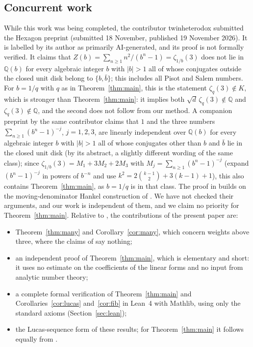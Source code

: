 \documentclass[11pt]{amsart}
\theoremstyle{definition}
\theoremstyle{remark}
\numberwithin{equation}{section}
\newcommand{\QQ}{\mathbb{Q}}
\begin{document}
\subsection*{Concurrent work}
While this work was being completed, the contributor twinheterodox submitted the Hexagon preprint \cite{Twi26}
(submitted 18 November, published 19 November 2026). It is labelled by its author as primarily AI-generated, and its
proof is not formally verified. It claims that $Z(b)=\sum_{n\ge1}n^2/(b^n-1)=\zeta_{1/b}(3)$ does not lie in $\QQ(b)$
for every algebraic integer $b$ with $|b|>1$ all of whose conjugates outside the closed unit disk belong to
$\{b,\bar b\}$; this includes all Pisot and Salem numbers. For $b=1/q$ with $q$ as in Theorem~\ref{thm:main}, this is
the statement $\zeta_q(3)\notin K$, which is stronger than Theorem~\ref{thm:main}: it implies both
$\sqrt d\,\zeta_q(3)\notin\QQ$ and $\zeta_q(3)\notin\QQ$, and the second does not follow from our method. A companion
preprint by the same contributor \cite{Twi26b} claims that $1$ and the three numbers $\sum_{n\ge1}(b^n-1)^{-j}$,
$j=1,2,3$, are linearly independent over $\QQ(b)$ for every algebraic integer $b$ with $|b|>1$ all of whose
conjugates other than $b$ and $\bar b$ lie in the closed unit disk (by its abstract, a slightly different wording of the
same class); since
$\zeta_{1/b}(3)=M_1+3M_2+2M_3$ with $M_j=\sum_{n\ge1}(b^n-1)^{-j}$ (expand $(b^n-1)^{-j}$ in powers of $b^{-n}$ and use
$k^2=2\binom{k-1}2+3(k-1)+1$), this also contains Theorem~\ref{thm:main}, as $b=1/q$ is in that class. The proof in \cite{Twi26} builds on
the moving-denominator Hankel construction of \cite{UPL}. We have not checked their arguments, and our work is independent of
them, and we claim no priority for Theorem~\ref{thm:main}. Relative to \cite{Twi26,Twi26b}, the contributions of the
present paper are:
\begin{itemize}
\item Theorem~\ref{thm:many} and Corollary~\ref{cor:many}, which concern weights above three, where the claims of
\cite{Twi26,Twi26b} say nothing;
\item an independent proof of Theorem~\ref{thm:main}, which is elementary and short: it uses no estimate on the
coefficients of the linear forms and no input from analytic number theory;
\item a complete formal verification of Theorem~\ref{thm:main} and Corollaries~\ref{cor:lucas} and~\ref{cor:fib} in
Lean~4 with Mathlib, using only the standard axioms (Section~\ref{sec:lean});
\item the Lucas-sequence form of these results; for Theorem~\ref{thm:main} it follows equally from \cite{Twi26}.
\end{itemize}
\end{document}
